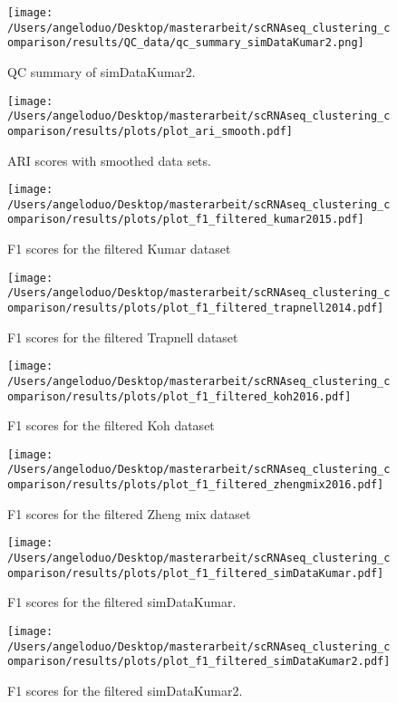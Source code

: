 \documentclass[12pt, a4paper]{article}\usepackage[]{graphicx}\usepackage[]{color}
\begin{document}
\begin{figure}[!h]
\texttt{[image: /Users/angeloduo/Desktop/masterarbeit/scRNAseq\_clustering\_comparison/results/QC\_data/qc\_summary\_simDataKumar2.png]}
\caption{QC summary of simDataKumar2. }
\label{fig:simDataKumar}
\end{figure}
\clearpage


\begin{figure}[!h]
\texttt{[image: /Users/angeloduo/Desktop/masterarbeit/scRNAseq\_clustering\_comparison/results/plots/plot\_ari\_smooth.pdf]}
\caption{ARI scores with smoothed data sets.  }
\label{fig:arifilt}
\end{figure}

\begin{figure}[!h]
\texttt{[image: /Users/angeloduo/Desktop/masterarbeit/scRNAseq\_clustering\_comparison/results/plots/plot\_f1\_filtered\_kumar2015.pdf]}
\caption{F1 scores for the filtered Kumar dataset }
\label{fig:f1kumar}
\end{figure}

\begin{figure}[!h]
\texttt{[image: /Users/angeloduo/Desktop/masterarbeit/scRNAseq\_clustering\_comparison/results/plots/plot\_f1\_filtered\_trapnell2014.pdf]}
\caption{F1 scores for  the filtered Trapnell dataset }
\label{fig:f1trapnell}
\end{figure}

\begin{figure}[!h]
\texttt{[image: /Users/angeloduo/Desktop/masterarbeit/scRNAseq\_clustering\_comparison/results/plots/plot\_f1\_filtered\_koh2016.pdf]}
\caption{F1 scores for the filtered Koh dataset }
\label{fig:f1koh}
\end{figure}

\begin{figure}[!h]
\texttt{[image: /Users/angeloduo/Desktop/masterarbeit/scRNAseq\_clustering\_comparison/results/plots/plot\_f1\_filtered\_zhengmix2016.pdf]}
\caption{F1 scores for the filtered Zheng mix dataset }
\label{fig:f1zheng}
\end{figure}

\begin{figure}[!h]
\texttt{[image: /Users/angeloduo/Desktop/masterarbeit/scRNAseq\_clustering\_comparison/results/plots/plot\_f1\_filtered\_simDataKumar.pdf]}
\caption{F1 scores for the filtered simDataKumar. }
\label{fig:f1sim}
\end{figure}

\begin{figure}[!h]
\texttt{[image: /Users/angeloduo/Desktop/masterarbeit/scRNAseq\_clustering\_comparison/results/plots/plot\_f1\_filtered\_simDataKumar2.pdf]}
\caption{F1 scores for the filtered simDataKumar2. }
\label{fig:f1sim2}
\end{figure}
\end{document}
